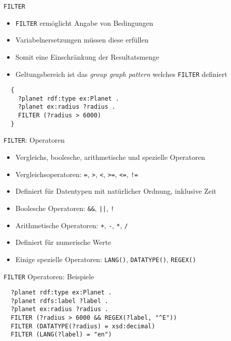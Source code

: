 \documentclass{beamer}
\begin{document}
\begin{frame}[fragile]{\texttt{FILTER}}

	\begin{itemize}
		\item \texttt{FILTER} ermöglicht Angabe von Bedingungen
		\item Variabelnersetzungen müssen diese erfüllen
		\item Somit eine Einschränkung der Resultatsmenge
		\item Geltungsbereich ist das \emph{group graph pattern} welches \texttt{FILTER} definiert
	\end{itemize}
	
	\begin{lstlisting}
  {
    ?planet rdf:type ex:Planet .
    ?planet ex:radius ?radius .
    FILTER (?radius > 6000)
  }
	\end{lstlisting}

\end{frame}

\begin{frame}{\texttt{FILTER}: Operatoren}
	
	\begin{itemize}
		\item Vergleichs, boolesche, arithmetische und spezielle Operatoren
		\item Vergleichsoperatoren: \texttt{=}, \texttt{>}, \texttt{<}, \texttt{>=}, \texttt{<=}, \texttt{!=}
		\item Definiert für Datentypen mit natürlicher Ordnung, inklusive Zeit
		\item Boolesche Operatoren: \texttt{\&\&}, \texttt{||}, \texttt{!}
		\item Arithmetische Operatoren: \texttt{+}, \texttt{-}, \texttt{*}, \texttt{/}
		\item Definiert für numerische Werte
		\item Einige spezielle Operatoren: \texttt{LANG()}, \texttt{DATATYPE()}, \texttt{REGEX()} 
	\end{itemize}
	
\end{frame}

\begin{frame}[fragile]{\texttt{FILTER} Operatoren: Beispiele}
	
	\begin{lstlisting}
  ?planet rdf:type ex:Planet .
  ?planet rdfs:label ?label .
  ?planet ex:radius ?radius .
  FILTER (?radius > 6000 && REGEX(?label, "^E"))
  FILTER (DATATYPE(?radius) = xsd:decimal)
  FILTER (LANG(?label) = "en")
	\end{lstlisting}
	
\end{frame}
\end{document}
